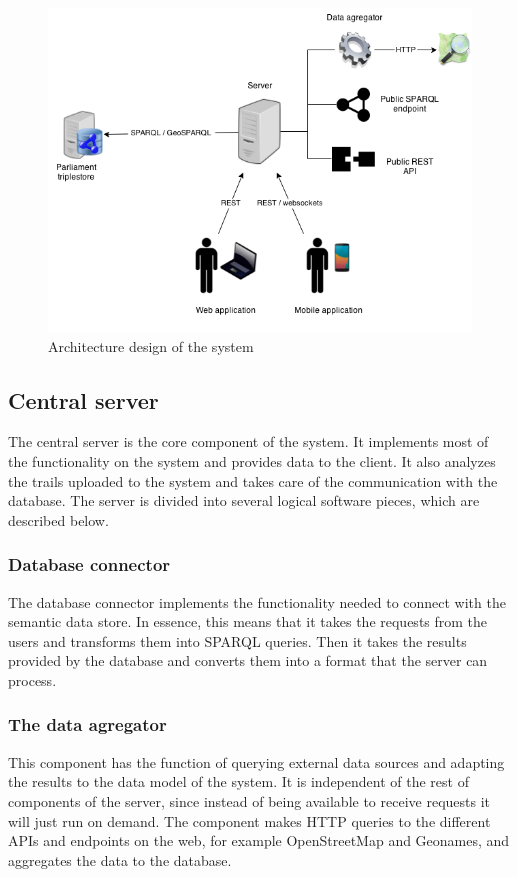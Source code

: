 \begin{figure}[ht]
  \centering
  \includegraphics[width=.8\textwidth]{fig/architecture}
  \caption{Architecture design of the system}
  \label{fig:architecture}
\end{figure} 

\subsection{Central server}

The central server is the core component of the system. It implements most of the functionality on the system and provides data to the client. It also analyzes the trails uploaded to the system and takes care of the communication with the database. The server is divided into several logical software pieces, which are described below.

\subsubsection*{Database connector}

The database connector implements the functionality needed to connect with the semantic data store. In essence, this means that it takes the requests from the users and transforms them into SPARQL queries. Then it takes the results provided by the database and converts them into a format that the server can process.

\subsubsection*{The data agregator}

This component has the function of querying external data sources and adapting the results to the data model of the system. It is independent of the rest of components of the server, since instead of being available to receive requests it will just run on demand. The component makes HTTP queries to the different APIs and endpoints on the web, for example OpenStreetMap and Geonames, and aggregates the data to the database.

